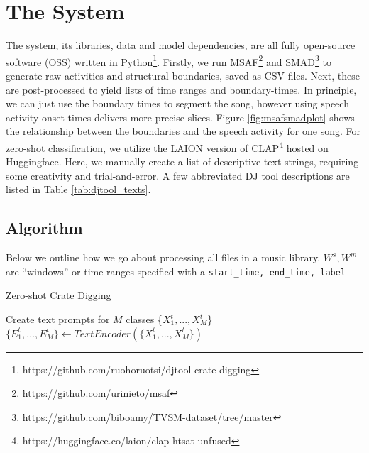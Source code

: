 \documentclass{article}
\newcommand{\code}{\texttt}
\begin{document}
\section{The System}\label{sec:system}

The system, its libraries, data and model dependencies, are all fully open-source software (OSS) written in Python\footnote{https://github.com/ruohoruotsi/djtool-crate-digging}. Firstly, we run MSAF\footnote{https://github.com/urinieto/msaf} and SMAD\footnote{https://github.com/biboamy/TVSM-dataset/tree/master} to generate raw activities and structural boundaries, saved as CSV files. Next, these are post-processed to yield lists of time ranges and boundary-times. In principle, we can just use the boundary times to segment the song, however using speech activity onset times delivers more precise slices. Figure \ref{fig:msafsmadplot} shows the relationship between the boundaries and the speech activity for one song. For zero-shot classification, we utilize the LAION version of CLAP\footnote{https://huggingface.co/laion/clap-htsat-unfused} hosted on Huggingface\cite{WuClap2023}. Here, we manually create a list of descriptive text strings, requiring some creativity and trial-and-error. A few abbreviated DJ tool descriptions are listed in Table \ref{tab:djtool_texts}.

\subsection{Algorithm}\label{subsec:algo}
Below we outline how we go about processing all files in a music library. $W^{s}, W^{m}$ are ``windows'' or time ranges specified with a \code{start\_time, end\_time, label}

\begin{algorithm}
    \caption{Zero-shot Crate Digging}\label{combo_algo}
    	Create text prompts for $M$ classes \{$X^{t}_{1},...,X^{t}_{M}$\} \\
    	 $\{E^{t}_{1},...,E^{t}_{M}\} \gets TextEncoder(\{X^{t}_{1},...,X^{t}_{M}\})$ \\
		\BlankLine

\end{algorithm}
\end{document}
